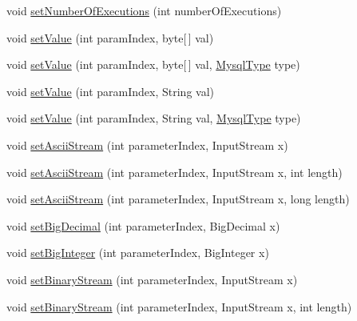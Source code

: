 \begin{DoxyCompactItemize}
\item 
void \mbox{\hyperlink{interfacecom_1_1mysql_1_1cj_1_1_query_bindings_a2a30b6f50c4c33fcfef0500197a28bb8}{set\+Number\+Of\+Executions}} (int number\+Of\+Executions)
\item 
void \mbox{\hyperlink{interfacecom_1_1mysql_1_1cj_1_1_query_bindings_a514f5b8e5302409619be7ce0750b2c64}{set\+Value}} (int param\+Index, byte\mbox{[}$\,$\mbox{]} val)
\item 
void \mbox{\hyperlink{interfacecom_1_1mysql_1_1cj_1_1_query_bindings_a6faaa9fdb3d5ef5e04f6bacef9ab7fa3}{set\+Value}} (int param\+Index, byte\mbox{[}$\,$\mbox{]} val, \mbox{\hyperlink{enumcom_1_1mysql_1_1cj_1_1_mysql_type}{Mysql\+Type}} type)
\item 
void \mbox{\hyperlink{interfacecom_1_1mysql_1_1cj_1_1_query_bindings_a93f1da1730b58d69e972b299539ae66c}{set\+Value}} (int param\+Index, String val)
\item 
void \mbox{\hyperlink{interfacecom_1_1mysql_1_1cj_1_1_query_bindings_ae4de974420b8a30d10203dcd8e7bb5a7}{set\+Value}} (int param\+Index, String val, \mbox{\hyperlink{enumcom_1_1mysql_1_1cj_1_1_mysql_type}{Mysql\+Type}} type)
\item 
void \mbox{\hyperlink{interfacecom_1_1mysql_1_1cj_1_1_query_bindings_a2ab9574b9dd0d2b15039d0516cc45ba1}{set\+Ascii\+Stream}} (int parameter\+Index, Input\+Stream x)
\item 
void \mbox{\hyperlink{interfacecom_1_1mysql_1_1cj_1_1_query_bindings_af740826505342555c0e7d37aab27196e}{set\+Ascii\+Stream}} (int parameter\+Index, Input\+Stream x, int length)
\item 
void \mbox{\hyperlink{interfacecom_1_1mysql_1_1cj_1_1_query_bindings_ad5b2cb40d03009c8827d234cd7240e0e}{set\+Ascii\+Stream}} (int parameter\+Index, Input\+Stream x, long length)
\item 
void \mbox{\hyperlink{interfacecom_1_1mysql_1_1cj_1_1_query_bindings_af8d9bc42bb6370ea5512c2500f912a79}{set\+Big\+Decimal}} (int parameter\+Index, Big\+Decimal x)
\item 
void \mbox{\hyperlink{interfacecom_1_1mysql_1_1cj_1_1_query_bindings_ac1e13d61b7c0fa7c969c42b6c23fc74c}{set\+Big\+Integer}} (int parameter\+Index, Big\+Integer x)
\item 
void \mbox{\hyperlink{interfacecom_1_1mysql_1_1cj_1_1_query_bindings_a9b69fba1d774379efe3e5a2aaa93483c}{set\+Binary\+Stream}} (int parameter\+Index, Input\+Stream x)
\item 
void \mbox{\hyperlink{interfacecom_1_1mysql_1_1cj_1_1_query_bindings_afef3a0ee212290498998b21db259a81f}{set\+Binary\+Stream}} (int parameter\+Index, Input\+Stream x, int length)

\end{DoxyCompactItemize}

